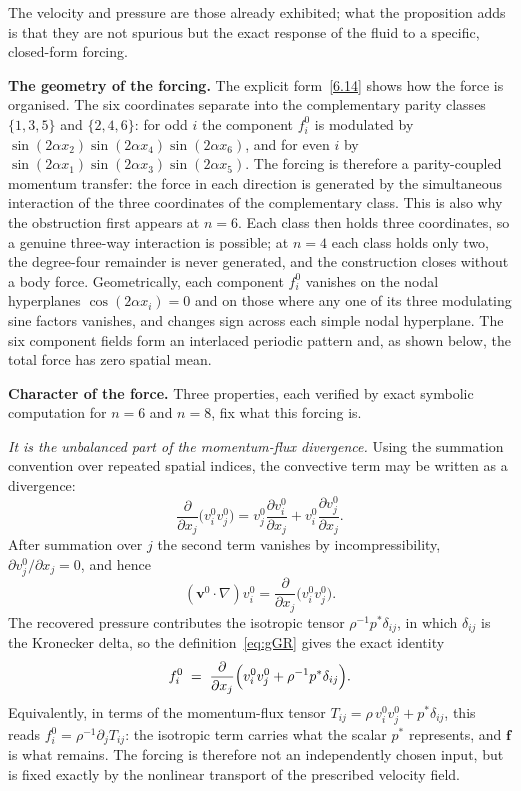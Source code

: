 \documentclass[11pt]{jfm}
\numberwithin{equation}{section}
\begin{document}
\noindent The velocity and pressure are those already exhibited; what the proposition adds is that
they are not spurious but the exact response of the fluid to a specific, closed-form forcing.

\medskip
\noindent\textbf{The geometry of the forcing.} The explicit form~\eqref{6.14} shows how the force
is organised. The six coordinates separate into the complementary parity classes $\{1,3,5\}$ and
$\{2,4,6\}$: for odd $i$ the component $f_i^0$ is modulated by
$\sin(2\alpha x_2)\allowbreak\sin(2\alpha x_4)\allowbreak\sin(2\alpha x_6)$, and for even $i$ by
$\sin(2\alpha x_1)\allowbreak\sin(2\alpha x_3)\allowbreak\sin(2\alpha x_5)$. The forcing is therefore a parity-coupled
momentum transfer: the force in each direction is generated by the simultaneous interaction of the
three coordinates of the complementary class. This is also why the obstruction first appears at
$n=6$. Each class then holds three coordinates, so a genuine three-way interaction is possible; at
$n=4$ each class holds only two, the degree-four remainder is never generated, and the
construction closes without a body force. Geometrically, each component $f_i^0$ vanishes on the nodal hyperplanes
$\cos(2\alpha x_i)=0$ and on those where any one of its three modulating sine factors vanishes,
and changes sign across each simple nodal hyperplane. The six component fields form an interlaced
periodic pattern and, as shown below, the total force has zero spatial mean.

\medskip
\noindent\textbf{Character of the force.} Three properties, each verified by exact symbolic
computation for $n=6$ and $n=8$, fix what this forcing is.

\emph{It is the unbalanced part of the momentum-flux divergence.} Using the summation convention
over repeated spatial indices, the convective term may be written as a divergence:
\[
\frac{\partial}{\partial x_j}\bigl(v_i^0v_j^0\bigr)
= v_j^0\frac{\partial v_i^0}{\partial x_j} + v_i^0\frac{\partial v_j^0}{\partial x_j}.
\]
After summation over $j$ the second term vanishes by incompressibility,
$\partial v_j^0/\partial x_j=0$, and hence
\[
(\boldsymbol{v}^0\!\cdot\!\nabla)v_i^0=\frac{\partial}{\partial x_j}\bigl(v_i^0v_j^0\bigr).
\]
The recovered pressure contributes the isotropic tensor $\rho^{-1}p^{*}\delta_{ij}$, in which
$\delta_{ij}$ is the Kronecker delta, so the definition~\eqref{eq:gGR} gives the exact
identity
\begin{equation}
\label{6.15}
f_i^0 \;=\; \frac{\partial}{\partial x_j}\Bigl(v_i^0 v_j^0 + \rho^{-1}p^{*}\delta_{ij}\Bigr).
\end{equation}
Equivalently, in terms of the momentum-flux tensor
$T_{ij}=\rho\,v_i^0 v_j^0+p^{*}\delta_{ij}$, this reads $f_i^0=\rho^{-1}\partial_j T_{ij}$: the
isotropic term carries what the scalar $p^{*}$ represents, and $\boldsymbol{f}$ is what remains.
The forcing is therefore not an independently chosen input, but is fixed exactly by the nonlinear
transport of the prescribed velocity field.
\end{document}
